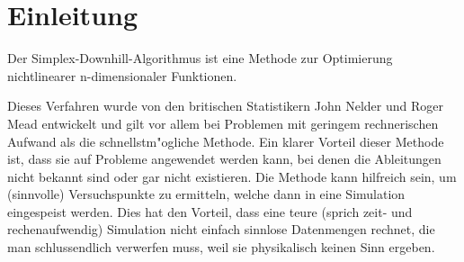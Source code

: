 \section{Einleitung}
Der Simplex-Downhill-Algorithmus ist eine Methode zur Optimierung nichtlinearer n-dimensionaler Funktionen.

Dieses Verfahren wurde von den britischen Statistikern John Nelder und Roger Mead entwickelt und gilt vor allem bei Problemen mit geringem rechnerischen Aufwand als die schnellstm"ogliche Methode.
Ein  klarer Vorteil dieser Methode ist, dass sie auf Probleme angewendet werden kann, bei denen  die Ableitungen nicht bekannt sind oder gar nicht existieren.
Die Methode kann hilfreich sein, um (sinnvolle) Versuchspunkte zu ermitteln, welche dann in eine Simulation eingespeist werden.
Dies hat den Vorteil, dass eine teure (sprich zeit- und rechenaufwendig) Simulation nicht einfach sinnlose Datenmengen rechnet, die man schlussendlich verwerfen muss, weil sie physikalisch keinen Sinn ergeben.
